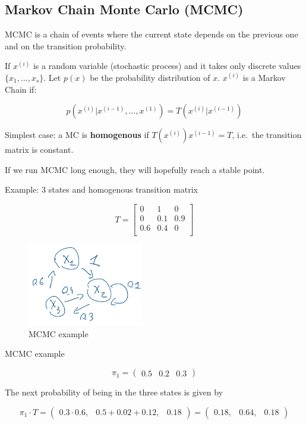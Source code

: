 \hypertarget{markov-chain-monte-carlo-mcmc}{%
\subsection{Markov Chain Monte Carlo
(MCMC)}\label{markov-chain-monte-carlo-mcmc}}

MCMC is a chain of events where the current state depends on the
previous one and on the transition probability.

If $x^{(i)}$ is a random variable (stochastic process) and it takes only
discrete values $\{x_1,\dots,x_s\}$. Let $p(x)$ be the probability
distribution of $x$. $x^{(i)}$ is a Markov Chain if:

$$
p(x^{(i)}|x^{(i-1)},\dots,x^{(1)})=T(x^{(i)}|x^{(i-1)})
$$

Simplest case: a MC is \textbf{homogenous} if $T(x^{(i)})x^{(i-1)}=T$,
i.e.~the transition matrix is constant.

If we run MCMC long enough, they will hopefully reach a stable point.

Example: 3 states and homogenous transition matrix

$$
T = \begin{bmatrix}
0 & 1 & 0\\
0 & 0.1 & 0.9\\ 0.6 & 0.4 & 0\\
\end{bmatrix}
$$

\begin{figure}
\centering
\includegraphics[width=0.45\textwidth]{mcmc.png}
\caption{MCMC example}
\end{figure}

MCMC example

$$
\pi_1=\begin{pmatrix}0.5 & 0.2& 0.3 \end{pmatrix}
$$

The next probability of being in the three states is given by

$$
\pi_1 \cdot T=\begin{pmatrix}0.3\cdot0.6, & 0.5+0.02+0.12,& 0.18 \end{pmatrix} = \begin{pmatrix}0.18, & 0.64,& 0.18 \end{pmatrix}
$$

